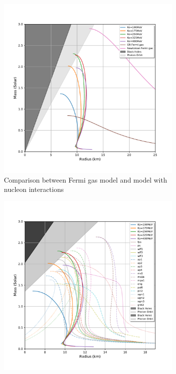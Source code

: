 \documentclass[draft,11pt]{article}
\theoremstyle{definition}
\theoremstyle{remark}
\begin{document}
            \begin{figure}[h]\begin{center}
                \begin{subfigure}[b]{.49\textwidth}
                    \includegraphics[width=\textwidth]{eos_compare_our_model}
                    \caption{Comparison between Fermi gas model and model with nucleon interactions}\label{fig/comparison.our.models}
                \end{subfigure}
                \begin{subfigure}[b]{.49\textwidth}
                    \includegraphics[width=\textwidth]{eos_compare_paper}

\end{subfigure}
\end{center}
\end{figure}
\end{document}

